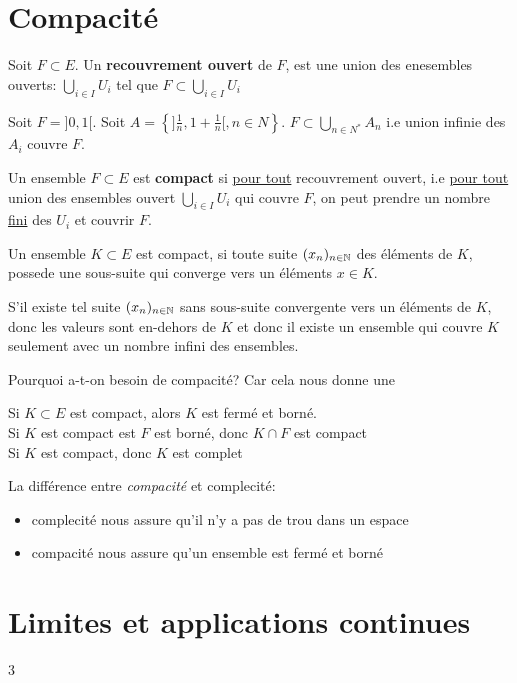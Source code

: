 \section{Compacité}
\begin{definition}
    Soit $F \subset E$. Un \textbf{recouvrement ouvert} de $F$, est une union des enesembles ouverts:  $\bigcup_{i \in I} U_i$ tel que $F \subset \bigcup_{i \in I} U_i$
\end{definition}
\begin{eg}
    Soit $F = ]0, 1[$. Soit $A = \left\{]\frac{1}{n}, 1 + \frac{1}{n}[, n \in N\right\}$. $F \subset \bigcup_{n \in N^{*}} A_n$ i.e union infinie des $A_i$ couvre $F$.
\end{eg}
\begin{definition}
    Un ensemble $F \subset E$ est \textbf{compact} si \underline{pour tout} recouvrement ouvert, i.e \underline{pour tout} union des ensembles ouvert $\bigcup_{i \in I} U_i$ qui couvre $F$, on peut prendre un nombre \underline{fini} des  $U_i$ et couvrir $F$.
\end{definition}
\begin{theorem}
    Un ensemble $K \subset E$ est compact, si toute suite $(x_n)_{n \in \mathbb{N}}$ des éléments de $K$, possede une sous-suite qui converge  vers un éléments $x \in K$.
\end{theorem}
\begin{intuition}
    S'il existe tel suite $(x_n)_{n \in \mathbb{N}}$ sans sous-suite convergente vers un éléments de  $K$, donc les valeurs sont en-dehors de  $K$ et donc il existe un ensemble qui couvre $K$  seulement avec un nombre infini des ensembles. 
\end{intuition}
Pourquoi a-t-on besoin de compacité? Car cela nous donne une
\begin{prop}
    Si $K \subset E$ est compact, alors $K$ est fermé et borné.\\
    Si $K$ est compact est  $F$ est borné, donc  $K \cap F$ est compact\\
    Si $K$ est compact, donc  $K$ est complet
\end{prop}
\begin{property}
    La différence entre \textit{compacité} et {complecité}:
    \begin{itemize}
        \item complecité nous assure qu'il n'y a pas de trou dans un espace
        \item compacité nous assure qu'un ensemble est fermé et borné
    \end{itemize}
\end{property}
\section{Limites et applications continues}
3

